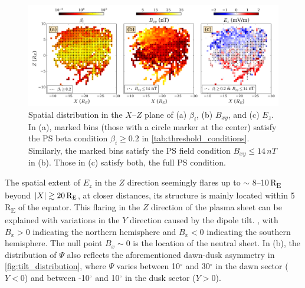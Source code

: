 \documentclass[draft]{agujournal2019}
\begin{document}
\begin{figure}
\centering
\noindent\includegraphics[width=\textwidth]{Fig6_XZ_distribution.pdf}
\caption{
Spatial distribution in the $X$--$Z$ plane of (a) $\beta_i$, (b) $B_{xy}$, and (c) $E_z$. In (a), marked bins (those with a circle marker at the center) satisfy the PS beta condition ${\beta_i\geq0.2}$ in \cref{tab:threshold_conditions}. Similarly, the marked bins satisfy the PS field condition ${B_{xy}\leq 14\,\si{nT}}$ in (b). Those in (c) satisfy both, the full PS condition.
}
\label{fig:XZ}
\end{figure}

The spatial extent of $E_z$ in the $Z$ direction seemingly flares up to $\sim$ 8--10\,\si{R_E} beyond ${\abs{X}\gtrsim20\,\si{R_E}}$,  at closer distances, its structure is mainly located within 5\,\si{R_E} of the equator. This flaring in the $Z$ direction of the plasma sheet can be explained with variations in the $Y$ direction caused by the dipole tilt. , with ${B_x>0}$ indicating the northern hemisphere and ${B_x<0}$ indicating the southern hemisphere. The null point ${B_x\sim0}$ is the location of the neutral sheet. In (b), the distribution of $\Psi$ also reflects the aforementioned dawn-dusk asymmetry in \mbox{\cref{fig:tilt_distribution}}, where $\Psi$ varies between 10$^\circ$ and 30$^\circ$ in the dawn sector ($Y<0$) and between -10$^\circ$ and 10$^\circ$ in the dusk sector ($Y>0$).
\end{document}
